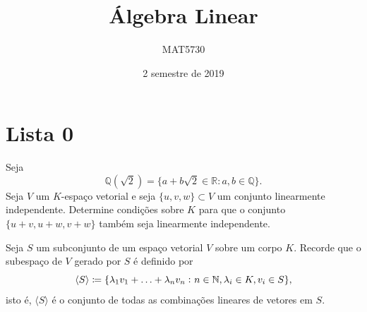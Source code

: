 \documentclass[11pt,a4paper]{article}
\title{Álgebra Linear}
\author{MAT5730}
\date{2 semestre de 2019}
\begin{document}
\maketitle
\tableofcontents
\newpage

\section{\textcolor{Floresta}{Lista 0}}

 Seja
\[
\mathbb{Q}(\sqrt{2}) = \{ a + b \sqrt{2} \in \mathbb{R} : a,b \in \mathbb{Q} \}.
\]
 Seja $V$ um $K$-espaço vetorial e seja $\{u, v, w\} \subset V$ um conjunto linearmente independente.
Determine condições sobre $K$ para que o conjunto $\{u + v, u + w, v + w\}$ também seja linearmente independente.

 Seja \(S\) um subconjunto de um espaço vetorial \(V\)
sobre um corpo \(K\). Recorde que o subespaço de \(V\) gerado por \(S\)
é definido por
\[\langle S\rangle\coloneqq\{\lambda_1v_1+\ldots+\lambda_nv_n\,\colon
  n\in\mathbb{N}, \lambda_i\in K, v_i\in S\},\]
isto é, \(\langle S\rangle\) é o conjunto de todas as
combinações lineares de vetores em \(S\).

\end{document}
